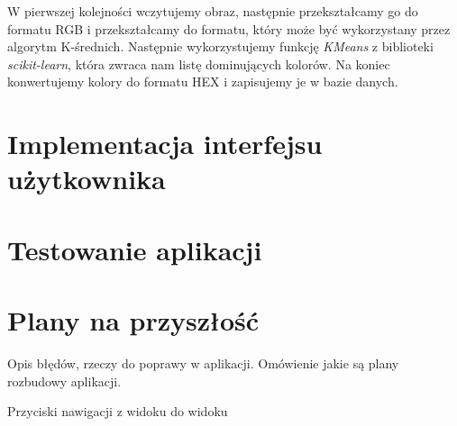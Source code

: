 W pierwszej kolejności wczytujemy obraz, następnie przekształcamy go do formatu RGB i przekształcamy do formatu, który może być wykorzystany przez algorytm K-średnich. Następnie wykorzystujemy funkcję \textit{KMeans} z biblioteki \textit{scikit-learn}, która zwraca nam listę dominujących kolorów. Na koniec konwertujemy kolory do formatu HEX i zapisujemy je w bazie danych.

\section{Implementacja interfejsu użytkownika}


\section{Testowanie aplikacji}


\section{Plany na przyszłość} \label{sec:plans}

Opis błędów, rzeczy do poprawy w aplikacji. Omówienie jakie są plany rozbudowy aplikacji.

Przyciski nawigacji z widoku do widoku